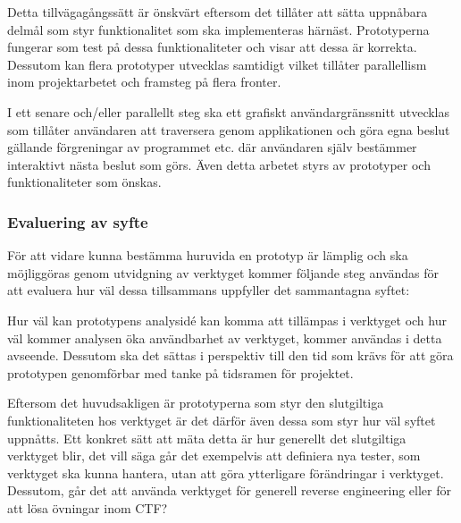Detta tillvägagångssätt är önskvärt eftersom det tillåter att sätta uppnåbara delmål som styr
funktionalitet som ska implementeras härnäst. Prototyperna fungerar som test på dessa
funktionaliteter och visar att dessa är korrekta. Dessutom kan flera prototyper 
utvecklas samtidigt vilket tillåter parallellism inom projektarbetet och
framsteg på flera fronter.

I ett senare och/eller parallellt steg ska ett grafiskt användargränssnitt
utvecklas som tillåter användaren att traversera genom applikationen och göra
egna beslut gällande förgreningar av programmet etc. där användaren själv
bestämmer interaktivt nästa beslut som görs. Även detta arbetet styrs av
prototyper och funktionaliteter som önskas.

\subsubsection{Evaluering av syfte}

För att vidare kunna bestämma huruvida en prototyp är lämplig och ska möjliggöras
genom utvidgning av verktyget kommer följande steg användas för att evaluera hur
väl dessa tillsammans uppfyller det sammantagna syftet:

Hur väl kan prototypens analysidé kan komma att tillämpas i verktyget och hur
väl kommer analysen öka användbarhet av verktyget, kommer användas i detta
avseende. Dessutom ska det sättas i perspektiv till den tid som krävs för att
göra prototypen genomförbar med tanke på tidsramen för projektet.

Eftersom det huvudsakligen är prototyperna som styr den slutgiltiga
funktionaliteten hos verktyget är det därför även dessa som styr hur väl syftet
uppnåtts. Ett konkret sätt att mäta detta är hur generellt det slutgiltiga
verktyget blir, det vill säga går det exempelvis att definiera nya tester, som verktyget
ska kunna hantera, utan att göra ytterligare förändringar i verktyget. Dessutom,
går det att använda verktyget för generell reverse engineering eller för att lösa övningar
inom CTF?




%
